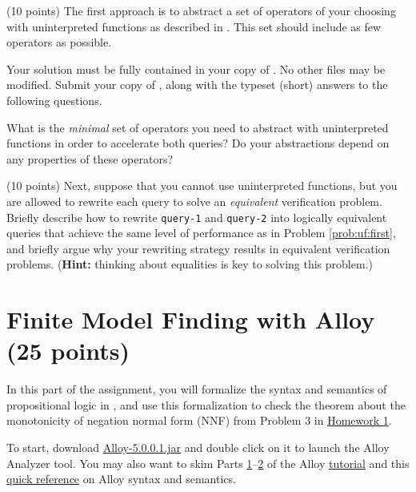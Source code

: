 \documentclass{handout}
\begin{document}
\begin{questions}
\item \label{prob:uf:first} (10 points) The first approach is to abstract a set
of operators of your choosing with uninterpreted functions as described in
.  This set should include as few operators as possible.

Your solution must be fully contained in your copy of .  No
other files may be modified.  Submit your copy of , along with
the typeset (short) answers to the following questions. 

What is the \emph{minimal} set of operators you need to abstract with
uninterpreted functions in order to accelerate both queries?   Do your
abstractions depend on any properties of these operators? 



\item \label{prob:uf:last} (10 points)  Next, suppose that you cannot use
uninterpreted functions, but you are allowed to rewrite each query to solve an
\emph{equivalent} verification problem.  Briefly describe how to rewrite
\texttt{query-1} and \texttt{query-2} into logically equivalent queries that
achieve the same level of performance as in Problem \ref{prob:uf:first}, and
briefly argue why your rewriting strategy results in equivalent verification
problems. (\textbf{Hint:}  thinking about equalities is key to solving this
problem.)



\end{questions}

\section{Finite Model Finding with Alloy (25 points)}

In this part of the assignment, you will formalize the syntax and semantics of
propositional logic in \alloy, and use this formalization to check the theorem
about the monotonicity of negation normal form (NNF) from Problem 3 in
\href{\website/doc/hw1.pdf}{Homework 1}.   

To start, download
\href{https://github.com/AlloyTools/org.alloytools.alloy/releases/download/v5.0.0.1/Alloy-5.0.0.1.jar}{Alloy-5.0.0.1.jar}
and double click on it to launch the Alloy Analyzer tool.  You may also want to
skim Parts
\href{http://alloytools.org/tutorials/day-course/s1_logic.pdf}{1}--\href{http://alloytools.org/tutorials/day-course/s2_language.pdf}{2}
of the Alloy \href{http://alloytools.org/tutorials/day-course/}{tutorial} and
this
\href{http://homepage.cs.uiowa.edu/~tinelli/classes/181/Fall17/Notes/alloy-cheatsheet.pdf}{quick
reference} on Alloy syntax and semantics. 
\end{document}
